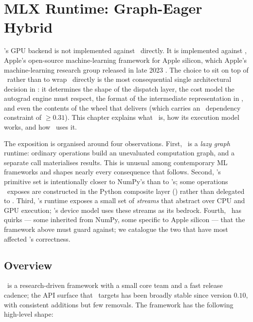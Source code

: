 \chapter{MLX Runtime: Graph-Eager Hybrid}
\label{ch:mlx_runtime}

\Lucid's GPU backend is not implemented against \Metal\ directly. It
is implemented against \MLX, Apple's open-source machine-learning
framework for Apple silicon, which Apple's machine-learning research
group released in late 2023 \cite{hannun_mlx_2023}. The choice to sit
on top of \MLX\ rather than to wrap \Metal\ directly is the most
consequential single architectural decision in \Lucid: it determines
the shape of the dispatch layer, the cost model the autograd engine
must respect, the format of the intermediate representation in
, and even the contents of the wheel that
 delivers (which carries an \MLX\ dependency
constraint of \(\geq 0.31\)). This chapter explains what \MLX\ is,
how its execution model works, and how \Lucid\ uses it.

The exposition is organised around four observations. First,
\MLX\ is a \emph{lazy graph} runtime: ordinary operations build an
unevaluated computation graph, and a separate  call
materialises results. This is unusual among contemporary ML
frameworks and shapes nearly every consequence that follows. Second,
\MLX's primitive set is intentionally closer to NumPy's than to
's; some operations \Lucid\ exposes are constructed in
the Python composite layer () rather than
delegated to \MLX. Third, \MLX's runtime exposes a small set of
\emph{streams} that abstract over CPU and GPU execution; \Lucid's
device model uses these streams as its bedrock. Fourth, \MLX\ has
quirks --- some inherited from NumPy, some specific to Apple silicon
--- that the framework above must guard against; we catalogue the
two that have most affected \Lucid's correctness.

\section{Overview}
\label{sec:mlx_runtime:overview}

\MLX\ is a research-driven framework with a small core team and a
fast release cadence; the API surface that \Lucid\ targets has been
broadly stable since version \(0.10\), with consistent additions but
few removals. The framework has the following high-level shape:

